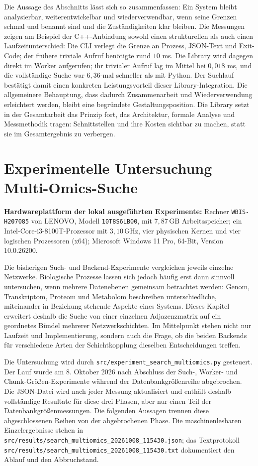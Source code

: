 \documentclass[a4paper,12pt, twoside]{report}
\newcommand{\experimenthardware}{%
	\par\smallskip\noindent
	\textbf{Hardwareplattform der lokal ausgeführten Experimente:} Rechner \texttt{WBIS-H207085} von LENOVO, Modell \texttt{10T8S6LB00}, mit $7{,}87\,\mathrm{GB}$ Arbeitsspeicher; ein Intel-Core-i3-8100T-Prozessor mit $3{,}10\,\mathrm{GHz}$, vier physischen Kernen und vier logischen Prozessoren (x64); Microsoft Windows 11 Pro, 64-Bit, Version $10.0.26200$.
	\par\smallskip}
\theoremstyle{definition}
\begin{document}
Die Aussage des Abschnitts lässt sich so zusammenfassen: Ein System bleibt analysierbar, weiterentwickelbar und wiederverwendbar, wenn seine Grenzen schmal und benannt sind und die Zuständigkeiten klar bleiben. Die Messungen zeigen am Beispiel der C++-Anbindung sowohl einen strukturellen als auch einen Laufzeitunterschied: Die CLI verlegt die Grenze an Prozess, JSON-Text und Exit-Code; der frühere triviale Aufruf benötigte rund $10$ ms. Die Library wird dagegen direkt im Worker aufgerufen; ihr trivialer Aufruf lag im Mittel bei $0{,}018$ ms, und die vollständige Suche war $6{,}36$-mal schneller als mit Python. Der Suchlauf bestätigt damit einen konkreten Leistungsvorteil dieser Library-Integration. Die allgemeinere Behauptung, dass dadurch Zusammenarbeit und Wiederverwendung erleichtert werden, bleibt eine begründete Gestaltungsposition. Die Library setzt in der Gesamtarbeit das Prinzip fort, das Architektur, formale Analyse und Messmethodik tragen: Schnittstellen und ihre Kosten sichtbar zu machen, statt sie im Gesamtergebnis zu verbergen.

\chapter{Experimentelle Untersuchung Multi-Omics-Suche}
\label{sec:multiomics}

\experimenthardware

Die bisherigen Such- und Backend-Experimente vergleichen jeweils einzelne Netzwerke. Biologische Prozesse lassen sich jedoch häufig erst dann sinnvoll untersuchen, wenn mehrere Datenebenen gemeinsam betrachtet werden: Genom, Transkriptom, Proteom und Metabolom beschreiben unterschiedliche, miteinander in Beziehung stehende Aspekte eines Systems. Dieses Kapitel erweitert deshalb die Suche von einer einzelnen Adjazenzmatrix auf ein geordnetes Bündel mehrerer Netzwerkschichten. Im Mittelpunkt stehen nicht nur Laufzeit und Implementierung, sondern auch die Frage, ob die beiden Backends für verschiedene Arten der Schichtkopplung dieselben Entscheidungen treffen.

Die Untersuchung wird durch \texttt{src/experiment\_search\_multiomics.py} gesteuert. Der Lauf wurde am 8. Oktober 2026 nach Abschluss der Such-, Worker- und Chunk-Größen-Experimente während der Datenbankgrößenreihe abgebrochen. Die JSON-Datei wird nach jeder Messung aktualisiert und enthält deshalb vollständige Resultate für diese drei Phasen, aber nur einen Teil der Datenbankgrößenmessungen. Die folgenden Aussagen trennen diese abgeschlossenen Reihen von der abgebrochenen Phase. Die maschinenlesbaren Einzelergebnisse stehen in \texttt{src/results/search\_multiomics\_20261008\_115430.json}; das Textprotokoll \texttt{src/results/search\_multiomics\_20261008\_115430.txt} dokumentiert den Ablauf und den Abbruchstand.
\end{document}
